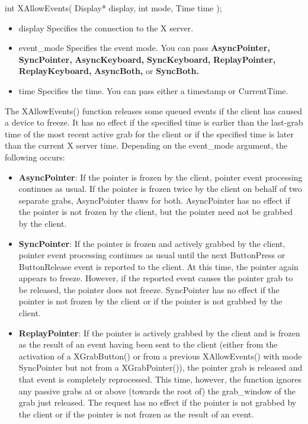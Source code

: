 \documentclass{report}
\begin{document}
\begin{itemize}
            \bigbreak \noindent 
            \begin{cppcode}
                int XAllowEvents(
                    Display* display, 
                    int mode, 
                    Time time
                );
            \end{cppcode}
            \bigbreak \noindent
            \begin{itemize}
                \item display	Specifies the connection to the X server.
                \item event\_mode	Specifies the event mode. You can pass \textbf{AsyncPointer,} \textbf{SyncPointer,} \textbf{AsyncKeyboard,} \textbf{SyncKeyboard,} \textbf{ReplayPointer,} \textbf{ReplayKeyboard,} \textbf{AsyncBoth,} or \textbf{SyncBoth.}
                \item time	Specifies the time. You can pass either a timestamp or CurrentTime.
            \end{itemize}
            The XAllowEvents() function releases some queued events if the client has caused a device to freeze. It has no effect if the specified time is earlier than the last-grab time of the most recent active grab for the client or if the specified time is later than the current X server time. Depending on the event\_mode argument, the following occurs:
            \begin{itemize}
                \item \textbf{AsyncPointer}:	If the pointer is frozen by the client, pointer event processing continues as usual. If the pointer is frozen twice by the client on behalf of two separate grabs, AsyncPointer thaws for both. AsyncPointer has no effect if the pointer is not frozen by the client, but the pointer need not be grabbed by the client.
                \item \textbf{SyncPointer}:	If the pointer is frozen and actively grabbed by the client, pointer event processing continues as usual until the next ButtonPress or ButtonRelease event is reported to the client. At this time, the pointer again appears to freeze. However, if the reported event causes the pointer grab to be released, the pointer does not freeze. SyncPointer has no effect if the pointer is not frozen by the client or if the pointer is not grabbed by the client.
                \item \textbf{ReplayPointer}:	If the pointer is actively grabbed by the client and is frozen as the result of an event having been sent to the client (either from the activation of a XGrabButton() or from a previous XAllowEvents() with mode SyncPointer but not from a XGrabPointer()), the pointer grab is released and that event is completely reprocessed. This time, however, the function ignores any passive grabs at or above (towards the root of) the grab\_window of the grab just released. The request has no effect if the pointer is not grabbed by the client or if the pointer is not frozen as the result of an event.

\end{itemize}
\end{itemize}
\end{document}
